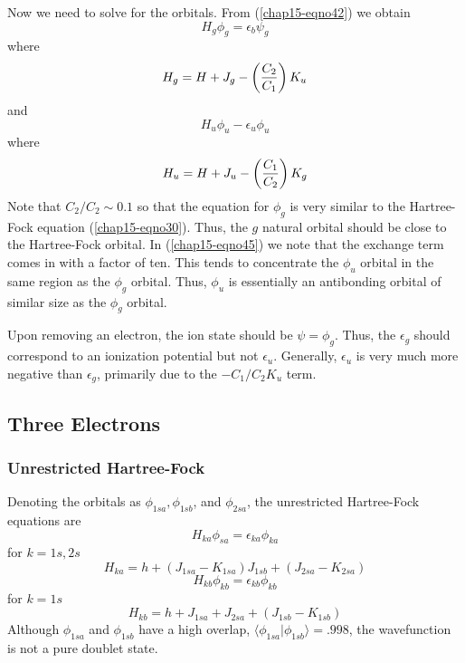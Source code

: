Now we need to solve for the orbitals. From (\ref{chap15-eqno42}) we
obtain
\begin{equation}
H_g \phi_g = \epsilon_b \psi_g
\label{chap15-eqno44}
\end{equation}
where
\begin{equation}
H_g = H + J_g - \left({C_2 \over C_1} \right) K_u
\end{equation}
and
\begin{equation}
H_u \phi_u - \epsilon_u \phi_u
\label{chap15-eqno45}
\end{equation}
where
\begin{equation}
H_u = H + J_u - \left( {C_1 \over C_2} \right) K_g
\end{equation}
Note that $C_2/C_2 \sim 0.1$ so that the equation for $\phi_g$ is very
similar to the Hartree-Fock equation (\ref{chap15-eqno30}).  Thus, the
$g$ natural orbital should be close to the Hartree-Fock orbital.  In
(\ref{chap15-eqno45}) we note that the exchange term comes in with a
factor of ten.  This tends to concentrate the $\phi_u$ orbital in the
same region as the $\phi_g$ orbital.  Thus, $\phi_u$ is essentially an
antibonding orbital of similar size as the $\phi_g$ orbital.

Upon removing an electron, the ion state should be $\psi = \phi_g$.  Thus, the
$\epsilon_g$ should correspond to an ionization potential but not 
$\epsilon_u$.  Generally, $\epsilon_u$ is
very much more negative than $\epsilon_g$, primarily due to the 
$-C_1/C_2K_u$ term.

\subsection{Three Electrons}

\subsubsection{Unrestricted Hartree-Fock}

Denoting the orbitals as $\phi_{1sa}, \phi_{1sb}$, and $\phi_{2sa}$, 
the unrestricted Hartree-Fock equations are
\begin{equation}
H_{ka} \phi_{sa} = \epsilon_{ka} \phi_{ka}
\end{equation}
for $k = 1s,2s$
\begin{equation}
H_{ka} = h + \left( J_{1sa} - K_{1sa} \right) J_{1sb} + \left( J_{2sa} - 
K_{2sa} \right)
\end{equation}
\begin{equation}
H_{kb} \phi_{kb} = \epsilon_{kb} \phi_{kb}
\end{equation}
for $k = 1s$
\begin{equation}
H_{kb} = h + J_{1sa} + J_{2sa} + \left( J_{1sb} - K_{1sb} \right)
\end{equation}
Although $\phi_{1sa}$ and $\phi_{1sb}$ have a high overlap, $\langle 
\phi_{1sa} | \phi_{1sb} \rangle = .998$, the wavefunction is not a pure 
doublet state.

